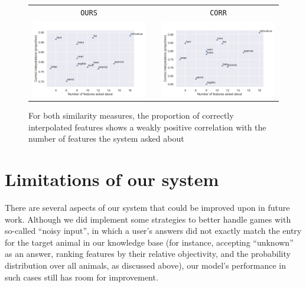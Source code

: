 \documentclass[11pt,a4paper]{article}
\begin{document}
\begin{figure}
\centering
\begin{tabular}{@{}ccc}
\texttt{OURS} && \texttt{CORR} \\
\includegraphics[trim=0 0 0 30,clip,width=.48\linewidth]{graphics/interpolation-eval-ours.pdf} && 
\includegraphics[trim=0 0 0 30,clip,width=.48\linewidth]{graphics/interpolation-eval-corr.pdf} \\
\end{tabular}
	\caption{For both similarity measures, the proportion of correctly interpolated features shows a weakly positive correlation with the number of features the system asked about}
	\label{fig:interp-eval}
\end{figure}

\section{Limitations of our system}
\label{sec:limit}

There are several aspects of our system that could be improved upon in future work. 
Although we did implement some strategies to better handle games with so-called ``noisy input'', in which a user's answers did not exactly match the entry for the target animal in our knowledge base (for instance, accepting ``unknown'' as an answer, ranking features by their relative objectivity, and the probability distribution over all animals, as discussed above), our model's performance in such cases still has room for improvement. 
\end{document}
